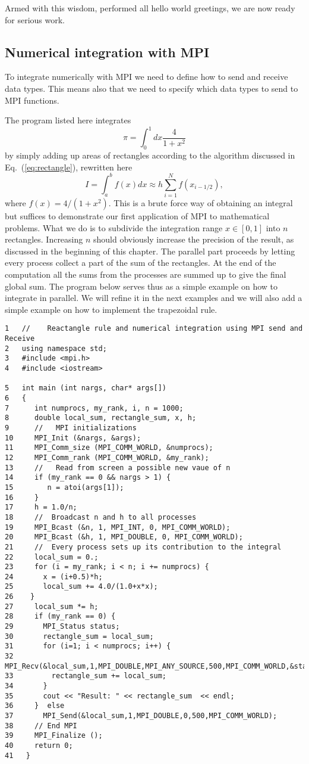 Armed with this wisdom, performed all hello world greetings, we are now ready for serious work. 

\subsection{Numerical integration with MPI}

To integrate numerically with MPI we need to define how to send and receive data types. This means also that we need
to specify  which data types to send  to MPI functions. 

The program listed here integrates \[  \pi = \int_0^1 dx \frac{4}{1+x^2} \] by simply adding up areas of
rectangles according to the algorithm discussed in Eq.~(\ref{eq:rectangle}), rewritten here
\[
   I=\int_a^bf(x) dx \approx  h\sum_{i=1}^N f(x_{i-1/2}), 
\]
where $f(x)=4/(1+x^2)$.
This is a brute force way of obtaining an integral but suffices to demonstrate our first 
application of MPI to mathematical problems. What we do is to subdivide the integration
range $x\in [0,1]$ into $n$ rectangles. Increasing $n$ should obviously increase the precision of the result,
as discussed in the beginning of this chapter. 
The parallel part proceeds by letting every process collect a part of the sum of the rectangles. 
At the end of the
computation all the sums from the processes are summed up to give the final global sum.
The program below serves thus as a simple
example on how to integrate in parallel.  We will refine it in the next examples and we will also add
a simple example on how to implement the trapezoidal rule. 
\lstset{language=c++}
\begin{lstlisting}[title={\url{http://folk.uio.no/mhjensen/compphys/programs/chapter05/program5.cpp}}]
1   //    Reactangle rule and numerical integration using MPI send and Receive
2   using namespace std;
3   #include <mpi.h>
4   #include <iostream>

5   int main (int nargs, char* args[])
6   {
7      int numprocs, my_rank, i, n = 1000;
8      double local_sum, rectangle_sum, x, h;
9      //   MPI initializations
10     MPI_Init (&nargs, &args);
11     MPI_Comm_size (MPI_COMM_WORLD, &numprocs);
12     MPI_Comm_rank (MPI_COMM_WORLD, &my_rank);
13     //   Read from screen a possible new vaue of n
14     if (my_rank == 0 && nargs > 1) {
15        n = atoi(args[1]);
16     }
17     h = 1.0/n;
18     //  Broadcast n and h to all processes
19     MPI_Bcast (&n, 1, MPI_INT, 0, MPI_COMM_WORLD);
20     MPI_Bcast (&h, 1, MPI_DOUBLE, 0, MPI_COMM_WORLD);
21     //  Every process sets up its contribution to the integral
22     local_sum = 0.;
23     for (i = my_rank; i < n; i += numprocs) {
24       x = (i+0.5)*h;
25       local_sum += 4.0/(1.0+x*x);
26    }
27     local_sum *= h;
28     if (my_rank == 0) {
29       MPI_Status status;
30       rectangle_sum = local_sum;
31       for (i=1; i < numprocs; i++) {
32         MPI_Recv(&local_sum,1,MPI_DOUBLE,MPI_ANY_SOURCE,500,MPI_COMM_WORLD,&status);
33         rectangle_sum += local_sum;
34       }
35       cout << "Result: " << rectangle_sum  << endl;
36     }  else
37       MPI_Send(&local_sum,1,MPI_DOUBLE,0,500,MPI_COMM_WORLD);
38     // End MPI
39     MPI_Finalize ();
40     return 0;
41   }
\end{lstlisting}
